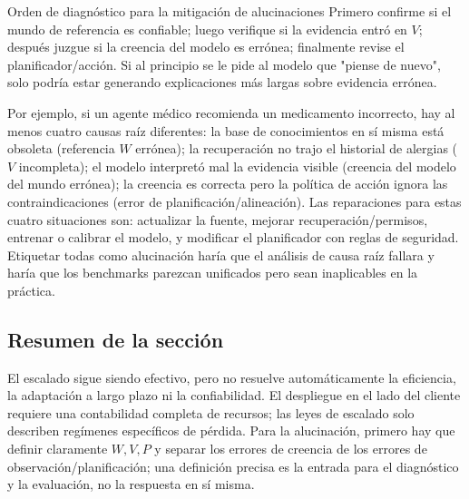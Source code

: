 



\begin{importantbox}{Orden de diagnóstico para la mitigación de alucinaciones}
Primero confirme si el mundo de referencia es confiable; luego verifique si la evidencia entró en $V$; después juzgue si la creencia del modelo es errónea; finalmente revise el planificador/acción. Si al principio se le pide al modelo que "piense de nuevo", solo podría estar generando explicaciones más largas sobre evidencia errónea.
\end{importantbox}

Por ejemplo, si un agente médico recomienda un medicamento incorrecto, hay al menos cuatro causas raíz diferentes: la base de conocimientos en sí misma está obsoleta (referencia $W$ errónea); la recuperación no trajo el historial de alergias ($V$ incompleta); el modelo interpretó mal la evidencia visible (creencia del modelo del mundo errónea); la creencia es correcta pero la política de acción ignora las contraindicaciones (error de planificación/alineación). Las reparaciones para estas cuatro situaciones son: actualizar la fuente, mejorar recuperación/permisos, entrenar o calibrar el modelo, y modificar el planificador con reglas de seguridad. Etiquetar todas como alucinación haría que el análisis de causa raíz fallara y haría que los benchmarks parezcan unificados pero sean inaplicables en la práctica.

\subsection{Resumen de la sección}

El escalado sigue siendo efectivo, pero no resuelve automáticamente la eficiencia, la adaptación a largo plazo ni la confiabilidad. El despliegue en el lado del cliente requiere una contabilidad completa de recursos; las leyes de escalado solo describen regímenes específicos de pérdida. Para la alucinación, primero hay que definir claramente $W, V, P$ y separar los errores de creencia de los errores de observación/planificación; una definición precisa es la entrada para el diagnóstico y la evaluación, no la respuesta en sí misma.


